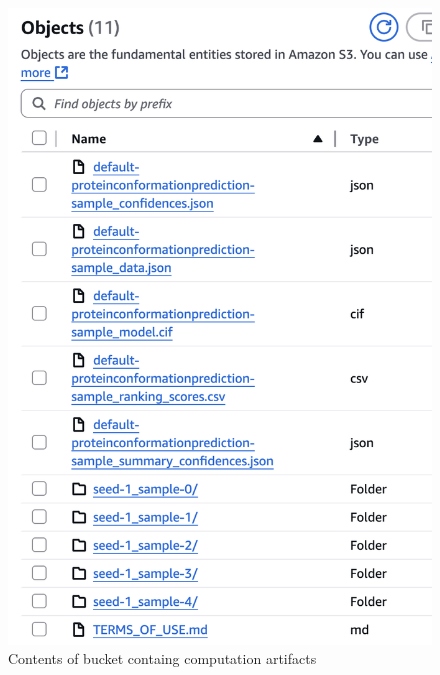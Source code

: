 \begin{figure}[htbp]
    \centering
    \includegraphics[width=\textwidth]{images/bucket2}
    \caption{Contents of bucket containg computation artifacts}
    \label{fig:bucket}
\end{figure}

